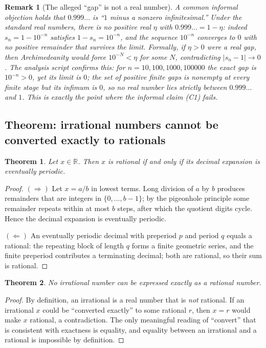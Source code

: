 \documentclass[11pt,a4paper]{article}
\newtheorem{theorem}{Theorem}
\newtheorem{remark}{Remark}
\begin{document}
\begin{remark}[The alleged ``gap'' is not a real number]
A common informal objection holds that $0.999\ldots$ is ``$1$ minus a
nonzero infinitesimal.'' Under the standard real numbers, there is no positive
real $\eta$ with $0.999\ldots = 1-\eta$: indeed $s_n=1-10^{-n}$ satisfies
$1-s_n=10^{-n}$, and the sequence $10^{-n}$ converges to $0$ with no positive
remainder that survives the limit. Formally, if $\eta>0$ were a real gap, then
Archimedeanity would force $10^{-N}<\eta$ for some $N$, contradicting
$|s_n-1|\to0$. The analysis script confirms this: for $n=10,100,1000,100000$ the
exact gap is $10^{-n}>0$, yet its limit is $0$; the set of positive finite gaps
is nonempty at every finite stage but its infimum is $0$, so no \emph{real}
number lies strictly between $0.999\ldots$ and $1$. This is exactly the point
where the informal claim (C1) fails.
\end{remark}

\subsection{Theorem: irrational numbers cannot be converted exactly to rationals}

\begin{theorem}
  \label{theorem:rational-per}
  Let $x\in\mathbb R$. Then $x$ is rational if and only if its decimal expansion
  is eventually periodic.
\end{theorem}

\begin{proof}
$(\Rightarrow)$ Let $x=a/b$ in lowest terms. Long division of $a$ by $b$
produces remainders that are integers in $\{0,\dots,b-1\}$; by the pigeonhole
principle some remainder repeats within at most $b$ steps, after which the
quotient digits cycle. Hence the decimal expansion is eventually periodic.

$(\Leftarrow)$ An eventually periodic decimal with preperiod $p$ and period
$q$ equals a rational: the repeating block of length $q$ forms a finite
geometric series, and the finite preperiod contributes a terminating decimal;
both are rational, so their sum is rational.
\end{proof}

\begin{theorem}
  No irrational number can be expressed exactly as a rational number.
\end{theorem}

\begin{proof}
By definition, an irrational is a real number that is \emph{not} rational. If an
irrational $x$ could be ``converted exactly'' to some rational $r$, then $x=r$
would make $x$ rational, a contradiction. The only meaningful reading of
``convert'' that is consistent with exactness is equality, and equality between
an irrational and a rational is impossible by definition.
\end{proof}
\end{document}
